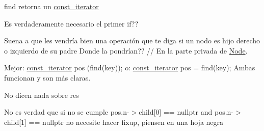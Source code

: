
\begin{DoxyRefList}
\item[\label{deprecated__deprecated000006}%
\hypertarget{deprecated__deprecated000006}{}%
Miembro \hyperlink{classaed2_1_1map_a0b0a11f906da2926f9eb342fcee79fd7_a0b0a11f906da2926f9eb342fcee79fd7}{aed2\+:\+:map$<$ Key, Meaning, Compare $>$\+:\+:at} (const Key \&key) const ]find retorna un \hyperlink{classaed2_1_1map_1_1const__iterator}{const\+\_\+iterator}  
\item[\label{deprecated__deprecated000019}%
\hypertarget{deprecated__deprecated000019}{}%
Miembro \hyperlink{classaed2_1_1map_a2bfa5165825979bf2431db55bc6bc9ca_a2bfa5165825979bf2431db55bc6bc9ca}{aed2\+:\+:map$<$ Key, Meaning, Compare $>$\+:\+:clear} ()]Es verdaderamente necesario el primer if?? 
\item[\label{deprecated__deprecated000022}%
\hypertarget{deprecated__deprecated000022}{}%
Miembro \hyperlink{classaed2_1_1map_a8fc6c73e0fcd59ae86887300b7287d9f_a8fc6c73e0fcd59ae86887300b7287d9f}{aed2\+:\+:map$<$ Key, Meaning, Compare $>$\+:\+:delete\+Fix\+Up} (\hyperlink{structaed2_1_1map_1_1Node}{Node} $\ast$padre\+\_\+nodo, \hyperlink{structaed2_1_1map_1_1Node}{Node} $\ast$hijo\+\_\+nodo)]Suena a que les vendría bien una operación que te diga si un nodo es hijo derecho o izquierdo de su padre Donde la pondrían?? // En la parte privada de \hyperlink{structaed2_1_1map_1_1Node}{Node}. 
\item[\label{deprecated__deprecated000018}%
\hypertarget{deprecated__deprecated000018}{}%
Miembro \hyperlink{classaed2_1_1map_a2ffadb42cd5f0bc7b3752ff159b75334_a2ffadb42cd5f0bc7b3752ff159b75334}{aed2\+:\+:map$<$ Key, Meaning, Compare $>$\+:\+:erase} (const Key \&key)]Mejor\+: \hyperlink{classaed2_1_1map_1_1const__iterator}{const\+\_\+iterator} pos (find(key)); o\+: \hyperlink{classaed2_1_1map_1_1const__iterator}{const\+\_\+iterator} pos = find(key); Ambas funcionan y son más claras. 
\item[\label{deprecated__deprecated000016}%
\hypertarget{deprecated__deprecated000016}{}%
Miembro \hyperlink{classaed2_1_1map_ad8e796bf9c9c558e5ce6b61e116253fe_ad8e796bf9c9c558e5ce6b61e116253fe}{aed2\+:\+:map$<$ Key, Meaning, Compare $>$\+:\+:erase} (\hyperlink{classaed2_1_1map_1_1const__iterator}{const\+\_\+iterator} pos)]No dicen nada sobre res 

No es verdad que si no se cumple pos.\+n-\/$>$child\mbox{[}0\mbox{]} == nullptr and pos.\+n-\/$>$child\mbox{[}1\mbox{]} == nullptr no necesite hacer fixup, piensen en una hoja negra 


\end{DoxyRefList}
